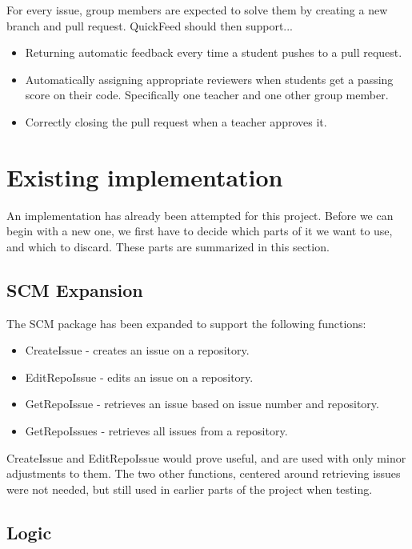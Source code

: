 For every issue, group members are expected to solve them by creating a new branch and pull request.
QuickFeed should then support...
\begin{itemize}
    \item Returning automatic feedback every time a student pushes to a pull request.
    \item Automatically assigning appropriate reviewers when students get a passing score on their code.
    Specifically one teacher and one other group member.
    \item Correctly closing the pull request when a teacher approves it.
\end{itemize}

\section{Existing implementation}

An implementation has already been attempted for this project. %
Before we can begin with a new one, we first have to decide which parts of it we want to use, and which to discard.
These parts are summarized in this section.

\subsection{SCM Expansion}
\label{sec:scm_expansion}

The SCM package has been expanded to support the following functions:

\begin{itemize}
    \item CreateIssue   - creates an issue on a repository.
    \item EditRepoIssue - edits an issue on a repository.
    \item GetRepoIssue  - retrieves an issue based on issue number and repository.
    \item GetRepoIssues - retrieves all issues from a repository.
\end{itemize}

CreateIssue and EditRepoIssue would prove useful, and are used with only minor adjustments to them.
The two other functions, centered around retrieving issues were not needed, but still used in earlier parts of the project when testing.

\subsection{Logic}

